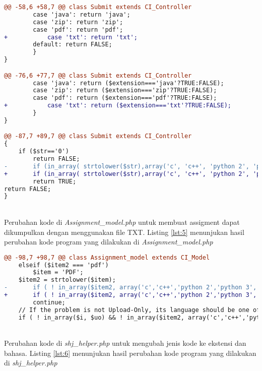 \begin{lstlisting}[language=diff, caption=Perubahan kode program pada \textit{Submit.php}, label=lst:4, basicstyle=\ttfamily, frame=single,
columns=fullflexible, keepspaces=true, breaklines=true]
@@ -58,6 +58,7 @@ class Submit extends CI_Controller
		case 'java': return 'java';
		case 'zip': return 'zip';
		case 'pdf': return 'pdf';
+       	case 'txt': return 'txt';
		default: return FALSE;
		}
}

@@ -76,6 +77,7 @@ class Submit extends CI_Controller
		case 'java': return ($extension==='java'?TRUE:FALSE);
		case 'zip': return ($extension==='zip'?TRUE:FALSE);
		case 'pdf': return ($extension==='pdf'?TRUE:FALSE);
+       	case 'txt': return ($extension==='txt'?TRUE:FALSE);
		}
}

@@ -87,7 +89,7 @@ class Submit extends CI_Controller
{
	if ($str=='0')
		return FALSE;
-   	if (in_array( strtolower($str),array('c', 'c++', 'python 2', 'python 3', 'java', 'zip', 'pdf')))
+   	if (in_array( strtolower($str),array('c', 'c++', 'python 2', 'python 3', 'java', 'zip', 'pdf', 'txt')))
		return TRUE;
return FALSE;
}
\end{lstlisting}
~\\
Perubahan kode di \textit{Assignment\_model.php} untuk membuat assigment dapat dikumpulkan dengan menggunakan file TXT. Listing \ref{lst:5} menunjukan hasil perubahan kode program yang dilakukan di \textit{Assignment\_model.php}

\begin{lstlisting}[language=diff, caption=Perubahan kode program pada \textit{Assignments\_model.php}, label=lst:5, basicstyle=\ttfamily, frame=single,
columns=fullflexible, keepspaces=true, breaklines=true]
@@ -98,7 +98,7 @@ class Assignment_model extends CI_Model
	elseif ($item2 === 'pdf')
		$item = 'PDF';
	$item2 = strtolower($item);
-   	if ( ! in_array($item2, array('c','c++','python 2','python 3','java','zip','pdf')))
+   	if ( ! in_array($item2, array('c','c++','python 2','python 3','java','zip','pdf','txt')))
		continue;
	// If the problem is not Upload-Only, its language should be one of {C,C++,Python 2, Python 3,Java}
	if ( ! in_array($i, $uo) && ! in_array($item2, array('c','c++','python 2','python 3','java')) )
\end{lstlisting}
~\\
Perubahan kode di \textit{shj\_helper.php} untuk mengubah jenis kode ke ekstensi dan bahasa. Listing \ref{lst:6} menunjukan hasil perubahan kode program yang dilakukan di \textit{shj\_helper.php}


